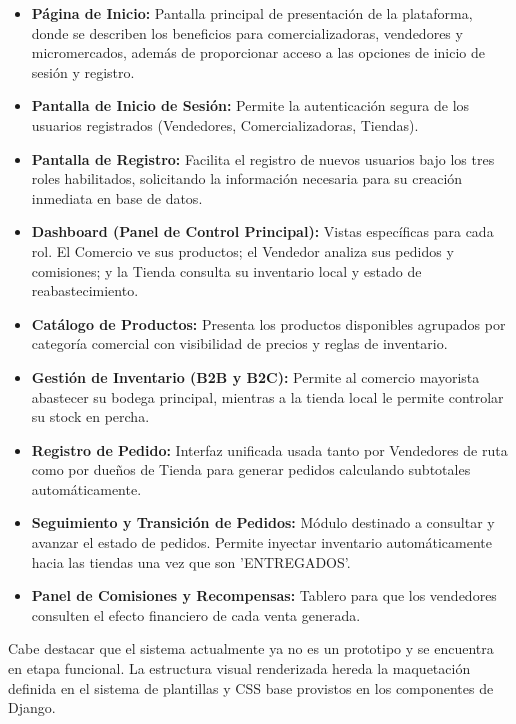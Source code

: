 \documentclass{article}
\begin{document}
\begin{itemize}
	
	\item \textbf{Página de Inicio:} Pantalla principal de presentación de la plataforma, donde se describen los beneficios para comercializadoras, vendedores y micromercados, además de proporcionar acceso a las opciones de inicio de sesión y registro.
	
	\item \textbf{Pantalla de Inicio de Sesión:} Permite la autenticación segura de los usuarios registrados (Vendedores, Comercializadoras, Tiendas).
	
	\item \textbf{Pantalla de Registro:} Facilita el registro de nuevos usuarios bajo los tres roles habilitados, solicitando la información necesaria para su creación inmediata en base de datos.
	
	\item \textbf{Dashboard (Panel de Control Principal):} Vistas específicas para cada rol. El Comercio ve sus productos; el Vendedor analiza sus pedidos y comisiones; y la Tienda consulta su inventario local y estado de reabastecimiento.
	
	\item \textbf{Catálogo de Productos:} Presenta los productos disponibles agrupados por categoría comercial con visibilidad de precios y reglas de inventario.
	
	\item \textbf{Gestión de Inventario (B2B y B2C):} Permite al comercio mayorista abastecer su bodega principal, mientras a la tienda local le permite controlar su stock en percha.
	
	\item \textbf{Registro de Pedido:} Interfaz unificada usada tanto por Vendedores de ruta como por dueños de Tienda para generar pedidos calculando subtotales automáticamente.
	
	\item \textbf{Seguimiento y Transición de Pedidos:} Módulo destinado a consultar y avanzar el estado de pedidos. Permite inyectar inventario automáticamente hacia las tiendas una vez que son 'ENTREGADOS'.
	
	\item \textbf{Panel de Comisiones y Recompensas:} Tablero para que los vendedores consulten el efecto financiero de cada venta generada.
	
\end{itemize}

Cabe destacar que el sistema actualmente ya no es un prototipo y se encuentra en etapa funcional. La estructura visual renderizada hereda la maquetación definida en el sistema de plantillas y CSS base provistos en los componentes de Django.
\end{document}
